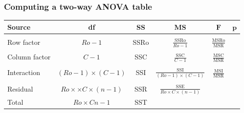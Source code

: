\documentclass[12pt,xcolor=dvipsnames,handout,mathserif,aspectratio=169]{beamer}
\newcommand{\tc}{\textcolor}
\begin{document}
%


\begin{frame}
\frametitle{Computing a two-way ANOVA table}
\begin{center}
\begin{tabular}{lccccc} \hline
\textbf{Source}     &  \textbf{df} &      \textbf{SS}   &    \textbf{MS}   &    $\mathbf{F}$ &     $\mathbf{p}$\\\hline
  &&&&&\\
 Row factor & $Ro - 1$  & SSRo &  $\frac{\mbox{SSRo}}{Ro - 1}$ &  $\frac{\mbox{MSRo}}{\mbox{MSR}}$  &  \\
  &&&&&\\
Column factor & $C - 1$ &  SSC &$\frac{\mbox{SSC}}{C - 1}$ &  $\frac{\mbox{MSC}}{\mbox{MSR}}$  &  \\
  &&&&&\\
Interaction  & $(Ro - 1)\times (C - 1)$ & SSI & $\frac{\mbox{SSI}}{(Ro - 1)\times (C - 1)}$ &  $\frac{\mbox{MSI}}{\mbox{MSR}}$  &  \\
  &&&&&\\
Residual      &  $Ro \times \times C\times (n - 1)$  &  SSR & $\frac{\mbox{SSE}}{Ro \times C\times (n - 1)}$ &    &  \\\hline
Total      &  $Ro \times  Cn - 1$ &  SST & & & \\\hline
\end{tabular}
\end{center}
\end{frame}
\end{document}
